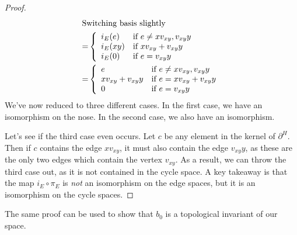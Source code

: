 \begin{proof}
\begin{align*}
\intertext{Switching basis slightly}
= & \left\{\begin{array}{ll} i_E(e) & \text{if $e\neq xv_{xy},v_{xy}y $}\\  i_E(xy) & \text{if $xv_{xy}+v_{xy}y$}\\  i_E(0) & \text{if $e=v_{xy}y$}\end{array}\right.\\
=& \left\{\begin{array}{ll} e & \text{if $e\neq xv_{xy},v_{xy}y $}\\  xv_{xy}+v_{xy}y & \text{if $e=xv_{xy}+v_{xy}y$}\\ 0 & \text{if $e=v_{xy}y$}\end{array}\right.\\
\end{align*}
We've now reduced to three different cases. In the first case, we have an isomorphism on the nose. In the second case, we also have an isomorphism.

Let's see if the third case even occurs. Let  $c$ be any element in the kernel of $\partial^H$.  Then if $c$ contains the edge $xv_{xy}$, it must also contain the edge $v_{xy}y$, as these are the only two edges which contain the vertex $v_{xy}$.  As a result, we can throw the third case out, as it is not contained in the cycle space. A key takeaway is that the map $i_E\circ \pi_E$ is \emph{not} an isomorphism on the edge spaces, but it is an isomorphism on the cycle spaces.
\end{proof}
The same proof can be used to show that $b_0$ is a topological invariant of our space. 
